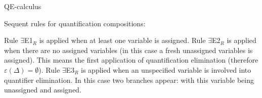 \begin{entry}{QE-calculus}
\begin{calculus}
\begin{center}
\begin{minipage}[b]{0.45\textwidth}
\raisebox{5pt}{RI$_L$} 
\end{minipage}
\begin{minipage}[t]{0.45\textwidth}
\raisebox{5pt}{RI$_R$} 
\end{minipage}

\begin{minipage}[b]{0.45\textwidth}
\raisebox{5pt}{RU$_L$} 
\end{minipage}
\begin{minipage}[t]{0.45\textwidth}
\raisebox{5pt}{RU$_R$} 
\end{minipage}
\end{center}

\smallskip
Sequent rules for   quantification compositions:
\begin{center}
\begin{minipage}[b]{0.45\textwidth}
\raisebox{5pt}{$\exists$E$_L$} 
\end{minipage}
\begin{minipage}[t]{0.45\textwidth}
\raisebox{5pt}{$\exists$E1$_R$} 
\end{minipage}


\begin{minipage}[t]{0.90\textwidth}
\raisebox{5pt}{$\exists$E2$_R$} 
\end{minipage}


\begin{minipage}[t]{0.90\textwidth}
\raisebox{5pt}{$\exists$E3$_R$} 
\end{minipage}
\end{center}
Rule $\exists$E1$_R$  is applied when at least one variable is assigned.
Rule $\exists$E2$_R$ is applied when there are no assigned variables (in this case a fresh unassigned variables is assigned). This means  the first application of quantification elimination (therefore $\varepsilon (\Delta)=\emptyset$).  Rule $\exists$E3$_R$ is applied when an unspecified  variable is involved into quantifier elimination. In this case two branches appear:  with this variable being unassigned and assigned.  





\end{calculus}
\end{entry}
